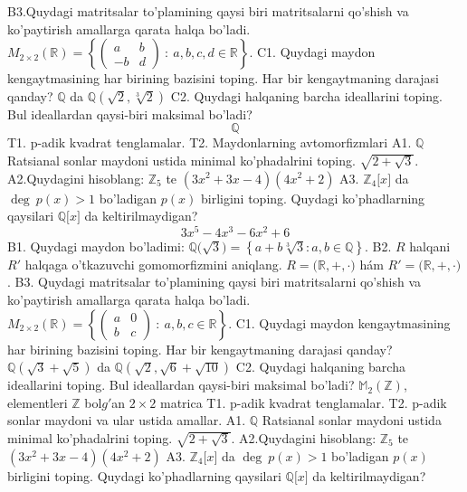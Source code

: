 B3.Quydagi matritsalar to'plamining qaysi biri matritsalarni qo'shish va ko'paytirish amallarga qarata halqa bo'ladi.
\(M_{2 \times 2}\mathbb{(R) =}\left\{ \begin{pmatrix}
a & b \\
 - b & d
\end{pmatrix}\ :\ a,b,c,d \in \mathbb{R} \right\}\).
C1. Quydagi maydon kengaytmasining har birining bazisini toping. Har bir kengaytmaning darajasi qanday?
\(\mathbb{Q}\) da \(\mathbb{Q}\left( \sqrt{2},\sqrt[3]{2} \right)\)
C2. Quydagi halqaning barcha ideallarini toping. Bul ideallardan qaysi-biri maksimal bo'ladi?
\[\mathbb{Q}\]
T1. p-adik kvadrat tenglamalar.
T2. Maydonlarning avtomorfizmlari
A1. \(\mathbb{Q}\) Ratsianal sonlar maydoni ustida minimal ko'phadalrini toping.
\(\sqrt{2 + \sqrt{3}}\).
A2.Quydagini hisoblang:
\(\mathbb{Z}_{5}\) te \(\left( 3x^{2} + 3x - 4 \right)\left( 4x^{2} + 2 \right)\)
A3. \(\mathbb{Z}_{4}\lbrack x\rbrack\) da \(\deg\ p(x) > 1\) bo'ladigan \(p(x)\) birligini toping. Quydagi ko'phadlarning qaysilari \(\mathbb{Q\lbrack}x\rbrack\) da keltirilmaydigan?
\[3x^{5} - 4x^{3} - 6x^{2} + 6\]
B1. Quydagi maydon bo'ladimi:
\(\mathbb{Q(}\sqrt{3}) = \left\{ a + b\sqrt[3]{3}:a,b \in \mathbb{Q} \right\}\).
B2. \(R\) halqani \(R'\) halqaga o'tkazuvchi gomomorfizmini aniqlang.
\(R\mathbb{= (R,} + , \cdot )\) hám \(R'\mathbb{= (R,} + , \cdot )\).
B3. Quydagi matritsalar to'plamining qaysi biri matritsalarni qo'shish va ko'paytirish amallarga qarata halqa bo'ladi.
\(M_{2 \times 2}\mathbb{(R) =}\left\{ \begin{pmatrix}
a & 0 \\
b & c
\end{pmatrix}\ :\ a,b,c \in \mathbb{R} \right\}\).
C1. Quydagi maydon kengaytmasining har birining bazisini toping. Har bir kengaytmaning darajasi qanday?
\(\mathbb{Q}\left( \sqrt{3} + \sqrt{5} \right)\) da \(\mathbb{Q}\left( \sqrt{2},\sqrt{6} + \sqrt{10} \right)\)
C2. Quydagi halqaning barcha ideallarini toping. Bul ideallardan qaysi-biri maksimal bo'ladi?
\(\mathbb{M}_{2}\left( \mathbb{Z} \right)\), elementleri \(\mathbb{Z}\) bol\(g'\)an \(2 \times 2\) matrica
T1. p-adik kvadrat tenglamalar.
T2. p-adik sonlar maydoni va ular ustida amallar.
A1. \(\mathbb{Q}\) Ratsianal sonlar maydoni ustida minimal ko'phadalrini toping.
\(\sqrt{2 + \sqrt{3}}\).
A2.Quydagini hisoblang:
\(\mathbb{Z}_{5}\) te \(\left( 3x^{2} + 3x - 4 \right)\left( 4x^{2} + 2 \right)\)
A3. \(\mathbb{Z}_{4}\lbrack x\rbrack\) da \(\deg\ p(x) > 1\) bo'ladigan \(p(x)\) birligini toping. Quydagi ko'phadlarning qaysilari \(\mathbb{Q\lbrack}x\rbrack\) da keltirilmaydigan?
